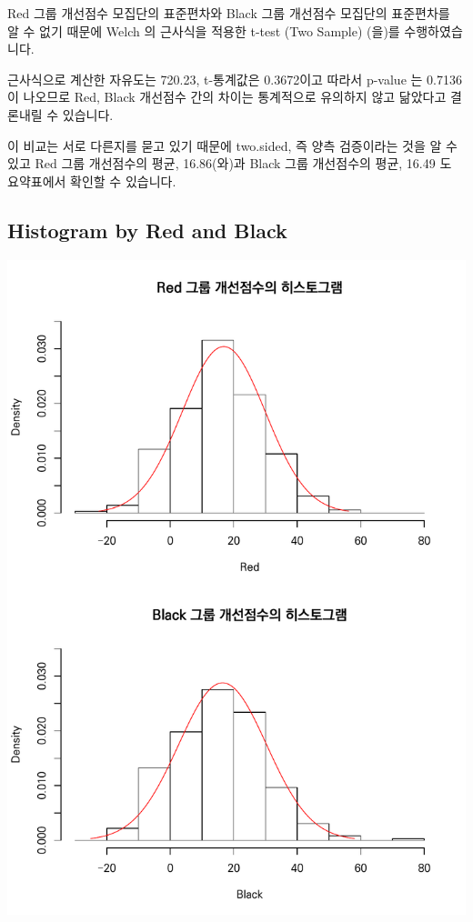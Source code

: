 \documentclass[
]{book}
\begin{document}
Red 그룹 개선점수 모집단의 표준편차와 Black 그룹 개선점수 모집단의 표준편차를 알 수 없기 때문에 Welch 의 근사식을 적용한 t-test (Two Sample) (을)를 수행하였습니다.

근사식으로 계산한 자유도는 720.23, t-통계값은 0.3672이고 따라서 p-value 는 0.7136이 나오므로 Red, Black 개선점수 간의 차이는 통계적으로 유의하지 않고 닮았다고 결론내릴 수 있습니다.

이 비교는 서로 다른지를 묻고 있기 때문에 two.sided, 즉 양측 검증이라는 것을 알 수 있고 Red 그룹 개선점수의 평균, 16.86(와)과 Black 그룹 개선점수의 평균, 16.49 도 요약표에서 확인할 수 있습니다.

\subsection{Histogram by Red and Black}\label{histogram-by-red-and-black}

\includegraphics{Quiz_report_2025_files/figure-latex/unnamed-chunk-321-1.pdf}
\end{document}
